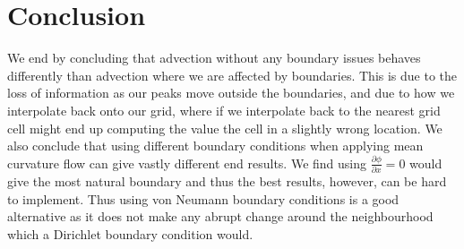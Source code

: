\section{Conclusion}
We end by concluding that advection without any boundary issues behaves differently than advection where we are affected by boundaries. This is due to the loss of information as our peaks move outside the boundaries, and due to how we interpolate back onto our grid, where if we interpolate back to the nearest grid cell might end up computing the value the cell in a slightly wrong location. We also conclude that using different boundary conditions when applying mean curvature flow can give vastly different end results. We find using $\frac{\partial \phi}{\partial x} = 0$ would give the most natural boundary and thus the best results, however, can be hard to implement. Thus using von Neumann boundary conditions is a good alternative as it does not make any abrupt change around the neighbourhood which a Dirichlet boundary condition would.
